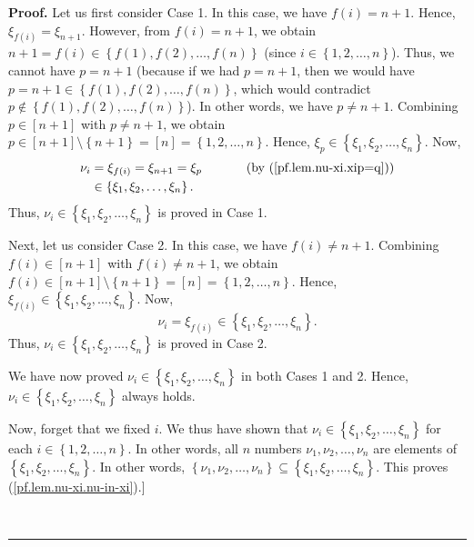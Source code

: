 \documentclass[numbers=enddot,12pt,final,onecolumn,notitlepage,english]{scrartcl}%
\theoremstyle{definition}
\newenvironment{proof}[1][Proof]{\noindent\textbf{#1.} }{\ \rule{0.5em}{0.5em}}
\newenvironment{verlong}{}{}
\begin{document}
\begin{verlong}
\begin{proof}
Let us first consider Case 1. In this case, we have $f\left(  i\right)  =n+1$.
Hence, $\xi_{f\left(  i\right)  }=\xi_{n+1}$. However, from $f\left(
i\right)  =n+1$, we obtain $n+1=f\left(  i\right)  \in\left\{  f\left(
1\right)  ,f\left(  2\right)  ,\ldots,f\left(  n\right)  \right\}  $ (since
$i\in\left\{  1,2,\ldots,n\right\}  $). Thus, we cannot have $p=n+1$ (because
if we had $p=n+1$, then we would have $p=n+1\in\left\{  f\left(  1\right)
,f\left(  2\right)  ,\ldots,f\left(  n\right)  \right\}  $, which would
contradict $p\notin\left\{  f\left(  1\right)  ,f\left(  2\right)
,\ldots,f\left(  n\right)  \right\}  $). In other words, we have $p\neq n+1$.
Combining $p\in\left[  n+1\right]  $ with $p\neq n+1$, we obtain $p\in\left[
n+1\right]  \setminus\left\{  n+1\right\}  =\left[  n\right]  =\left\{
1,2,\ldots,n\right\}  $. Hence, $\xi_{p}\in\left\{  \xi_{1},\xi_{2},\ldots
,\xi_{n}\right\}  $. Now,
\begin{align*}
\nu_{i}  &  =\xi_{f\left(  i\right)  }=\xi_{n+1}=\xi_{p}%
\ \ \ \ \ \ \ \ \ \ \left(  \text{by (\ref{pf.lem.nu-xi.xip=q})}\right) \\
&  \in\left\{  \xi_{1},\xi_{2},\ldots,\xi_{n}\right\}  .
\end{align*}
Thus, $\nu_{i}\in\left\{  \xi_{1},\xi_{2},\ldots,\xi_{n}\right\}  $ is proved
in Case 1.

Next, let us consider Case 2. In this case, we have $f\left(  i\right)  \neq
n+1$. Combining $f\left(  i\right)  \in\left[  n+1\right]  $ with $f\left(
i\right)  \neq n+1$, we obtain $f\left(  i\right)  \in\left[  n+1\right]
\setminus\left\{  n+1\right\}  =\left[  n\right]  =\left\{  1,2,\ldots
,n\right\}  $. Hence, $\xi_{f\left(  i\right)  }\in\left\{  \xi_{1},\xi
_{2},\ldots,\xi_{n}\right\}  $. Now,
\[
\nu_{i}=\xi_{f\left(  i\right)  }\in\left\{  \xi_{1},\xi_{2},\ldots,\xi
_{n}\right\}  .
\]
Thus, $\nu_{i}\in\left\{  \xi_{1},\xi_{2},\ldots,\xi_{n}\right\}  $ is proved
in Case 2.

We have now proved $\nu_{i}\in\left\{  \xi_{1},\xi_{2},\ldots,\xi_{n}\right\}
$ in both Cases 1 and 2. Hence, $\nu_{i}\in\left\{  \xi_{1},\xi_{2},\ldots
,\xi_{n}\right\}  $ always holds.

Now, forget that we fixed $i$. We thus have shown that $\nu_{i}\in\left\{
\xi_{1},\xi_{2},\ldots,\xi_{n}\right\}  $ for each $i\in\left\{
1,2,\ldots,n\right\}  $. In other words, all $n$ numbers $\nu_{1},\nu
_{2},\ldots,\nu_{n}$ are elements of $\left\{  \xi_{1},\xi_{2},\ldots,\xi
_{n}\right\}  $. In other words, $\left\{  \nu_{1},\nu_{2},\ldots,\nu
_{n}\right\}  \subseteq\left\{  \xi_{1},\xi_{2},\ldots,\xi_{n}\right\}  $.
This proves (\ref{pf.lem.nu-xi.nu-in-xi}).] \medskip


\end{proof}
\end{verlong}
\end{document}
